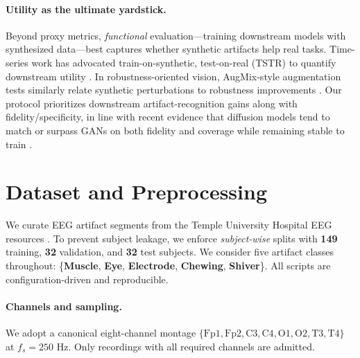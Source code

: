 \documentclass{article}
\begin{document}
\paragraph{Utility as the ultimate yardstick.}
Beyond proxy metrics, \emph{functional} evaluation—training downstream models with synthesized data—best captures whether synthetic artifacts help real tasks. Time-series work has advocated train-on-synthetic, test-on-real (TSTR) to quantify downstream utility \citep{yoon2019timegan}. In robustness-oriented vision, AugMix-style augmentation tests similarly relate synthetic perturbations to robustness improvements \citep{hendrycks2020augmix}. Our protocol prioritizes downstream artifact-recognition gains along with fidelity/specificity, in line with recent evidence that diffusion models tend to match or surpass GANs on both fidelity and coverage while remaining stable to train \citep{dhariwal2021dmbeatgans,nichol2021improved}.


\section{Dataset and Preprocessing}
\label{sec:data}
We curate EEG artifact segments from the Temple University Hospital EEG resources \citep{obeid2016temple}. To prevent subject leakage, we enforce \emph{subject-wise} splits with \textbf{149} training, \textbf{32} validation, and \textbf{32} test subjects. We consider five artifact classes throughout: \{\textbf{Muscle}, \textbf{Eye}, \textbf{Electrode}, \textbf{Chewing}, \textbf{Shiver}\}. All scripts are configuration-driven and reproducible.

\paragraph{Channels and sampling.}
We adopt a canonical eight-channel montage \(\{\text{Fp1}, \text{Fp2}, \text{C3}, \text{C4}, \text{O1}, \text{O2}, \text{T3}, \text{T4}\}\) at \(f_s = 250\) Hz. Only recordings with all required channels are admitted.
\end{document}
